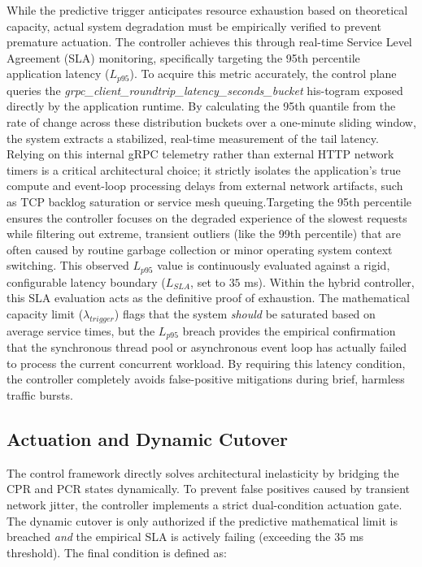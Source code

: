 \documentclass{ieeeaccess}
\begin{document}
\begin{enumerate}
	While the predictive trigger anticipates resource exhaustion based on theoretical capacity, actual system degradation must be empirically verified to prevent premature actuation. The controller achieves this through real-time Service Level Agreement (SLA) monitoring, specifically targeting the 95th percentile application latency ($L_{p95}$). To acquire this metric accurately, the control plane queries the \textit{grpc\_client\_roundtrip\_latency\_seconds\_bucket} his-togram exposed directly by the application runtime. By calculating the 95th quantile from the rate of change across these distribution buckets over a one-minute sliding window, the system extracts a stabilized, real-time measurement of the tail latency. Relying on this internal gRPC telemetry rather than external HTTP network timers is a critical architectural choice; it strictly isolates the application's true compute and event-loop processing delays from external network artifacts, such as TCP backlog saturation or service mesh queuing.Targeting the 95th percentile ensures the controller focuses on the degraded experience of the slowest requests while filtering out extreme, transient outliers (like the 99th percentile) that are often caused by routine garbage collection or minor operating system context switching. This observed $L_{p95}$ value is continuously evaluated against a rigid, configurable latency boundary ($L_{SLA}$, set to $35$ ms). Within the hybrid controller, this SLA evaluation acts as the definitive proof of exhaustion. The mathematical capacity limit ($\lambda_{trigger}$) flags that the system \textit{should} be saturated based on average service times, but the $L_{p95}$ breach provides the empirical confirmation that the synchronous thread pool or asynchronous event loop has actually failed to process the current concurrent workload. By requiring this latency condition, the controller completely avoids false-positive mitigations during brief, harmless traffic bursts.

\end{enumerate}


\subsection{Actuation and Dynamic Cutover}
\label{sec3.3}

The control framework directly solves architectural inelasticity by bridging the CPR and PCR states dynamically. To prevent false positives caused by transient network jitter, the controller implements a strict dual-condition actuation gate. The dynamic cutover is only authorized if the predictive mathematical limit is breached \textit{and} the empirical SLA is actively failing (exceeding the $35$ ms threshold). The final condition is defined as:
\end{document}
